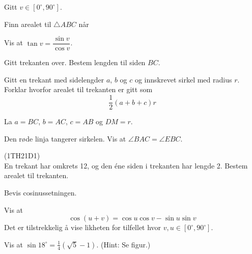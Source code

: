 




\opgt

Gitt $ v\in [0^\circ, 90^\circ] $.

Finn arealet til $ \triangle ABC $ når



Vis at $ \tan v = \dfrac{\sin v}{\cos v}  $.

\newpage
\nes

Gitt trekanten over. Bestem lengden til siden $ BC $.

Gitt en trekant med sidelengder $ a $, $ b $ og $ c $ og innskrevet sirkel med radius $ r $. Forklar hvorfor arealet til trekanten er gitt som 
\[ \frac{1}{2}(a+b+c)r \]

La $ a=BC $, $ b=AC $, $ c=AB $ og $ DM=r $.

Den røde linja tangerer sirkelen. Vis at $ \angle BAC=\angle EBC $.
\newpage

 (1TH21D1)\\ %
En trekant har omkrets 12, og den éne siden i trekanten har lengde 2. Bestem arealet til trekanten.

Bevis cosinussetningen.

Vis at
\[ \cos(u+v)= \cos u\cos v-\sin u \sin v \]
Det er tilstrekkelig å vise likheten for tilfellet hvor $ v,u \in [0^\circ, 90^\circ] $.

Vis at $ \sin 18^\circ=\frac{1}{4}(\sqrt{5}-1) $. (Hint: Se figur.)



